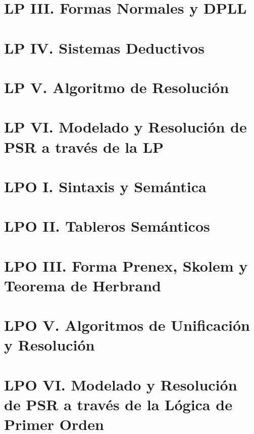 \documentclass[a4paper]{report}
\begin{document}
\chapter{LP III. Formas Normales y DPLL}
\renewcommand{\mtctitle}{}
\mtcskip
\minitoc
\newpage
\chapter{LP IV. Sistemas Deductivos}
\renewcommand{\mtctitle}{}
\mtcskip
\minitoc
\newpage
\chapter{LP V. Algoritmo de Resolución}
\renewcommand{\mtctitle}{}
\mtcskip
\minitoc
\newpage
\chapter{LP VI. Modelado y Resolución de PSR a través de la LP}
\renewcommand{\mtctitle}{}
\mtcskip
\minitoc
\newpage

\chapter{LPO I. Sintaxis y Semántica}
\renewcommand{\mtctitle}{}
\mtcskip
\minitoc
\newpage
\chapter{LPO II. Tableros Semánticos}
\renewcommand{\mtctitle}{}
\mtcskip
\minitoc
\newpage
\chapter{LPO III. Forma Prenex, Skolem y Teorema de Herbrand}
\renewcommand{\mtctitle}{}
\mtcskip
\minitoc
\newpage
\chapter{LPO V. Algoritmos de Unificación y Resolución}
\renewcommand{\mtctitle}{}
\mtcskip
\minitoc
\newpage
\chapter{LPO VI. Modelado y Resolución de PSR a través de la Lógica de Primer Orden}
\renewcommand{\mtctitle}{}
\mtcskip
\minitoc
\newpage
\end{document}

